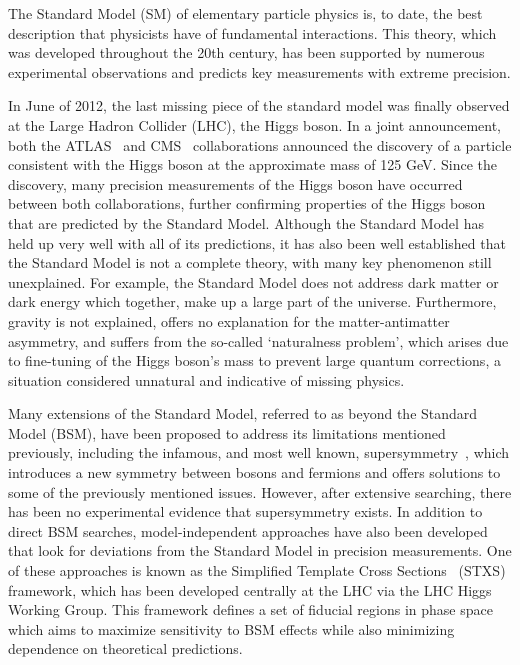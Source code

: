 The Standard Model (SM) of elementary particle physics is, to date, the best description that physicists have of fundamental interactions. This theory, which was developed throughout the
20th century, has been supported by numerous experimental observations and predicts key measurements with extreme precision. 

In June of 2012, the last missing piece of the standard model was finally observed at the Large Hadron Collider (LHC), the Higgs boson. In a joint announcement, both the ATLAS~\cite{ATLAS_Higgs_discovery} and CMS~\cite{CMS_Higgs_discovery} collaborations announced the discovery of a particle consistent with the Higgs boson at the approximate mass of
125 GeV. Since the discovery, many precision measurements of the Higgs boson have occurred between both collaborations, further confirming properties of the Higgs boson that are predicted by the Standard Model. Although the Standard Model has held up very well with all of its predictions, it has also been well established that the Standard Model is not a complete theory, with many key phenomenon still unexplained. 
For example, the Standard Model does not address dark matter or dark energy which together, make up a large part of the universe. Furthermore, gravity is not explained, offers no explanation for the matter-antimatter asymmetry, and suffers from the so-called `naturalness problem', which arises due to fine-tuning of the Higgs boson's mass to prevent large quantum corrections, a situation considered unnatural and indicative of missing physics.

Many extensions of the Standard Model, referred to as beyond the Standard Model (BSM), have been proposed to address its limitations mentioned previously, including the infamous, and most well known, supersymmetry~\cite{MARTIN_1998}, which introduces a new symmetry between bosons and fermions and offers solutions to some of the previously mentioned issues. However, after extensive searching, there has been no experimental evidence that supersymmetry exists.
In addition to direct BSM searches, model-independent approaches have also been developed that look for deviations from the Standard Model in precision measurements. One of these approaches is known as the Simplified Template Cross Sections~\cite{STXS_1_1} (STXS) framework, which has been developed centrally at the LHC via the LHC Higgs Working Group. This framework defines a set of fiducial regions in phase space which aims to maximize sensitivity to BSM effects while also minimizing dependence on theoretical predictions.

